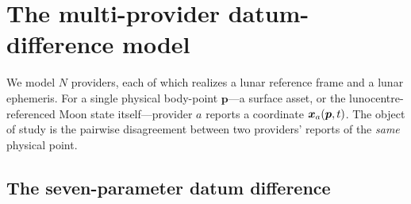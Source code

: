 \section{The multi-provider datum-difference model}
\label{sec:model}

We model $N$ providers, each of which realizes a lunar reference frame and a lunar
ephemeris. For a single physical body-point $\bm{p}$---a surface asset, or the
lunocentre-referenced Moon state itself---provider $a$ reports a coordinate
$\bm{x}_a(\bm{p},t)$. The object of study is the pairwise disagreement between two
providers' reports of the \emph{same} physical point.

\subsection{The seven-parameter datum difference}
\label{sec:datumdiff}

